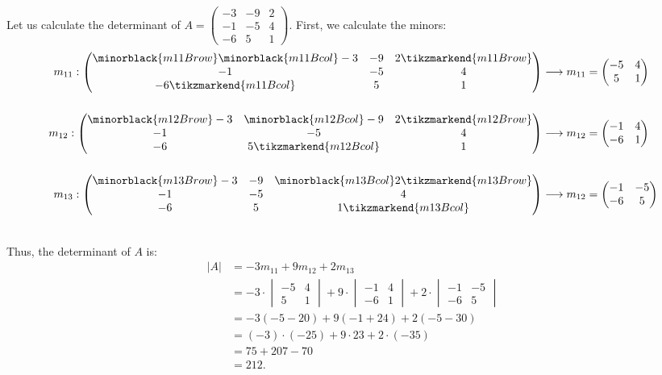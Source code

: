 \begin{example}
  Let us calculate the determinant of $A=\begin{pmatrix} -3 & -9 & 2 \\ -1 & -5 & 4 \\ -6 & 5 & 1 \end{pmatrix}$. First, we calculate the minors:
  \begin{align*}
	m_{11}: \begin{pmatrix} \minorblack{m11Brow}\minorblack{m11Bcol}-3 & -9 & 2\tikzmarkend{m11Brow} \\ -1 & -5 & 4 \\ -6\tikzmarkend{m11Bcol} & 5 & 1 \end{pmatrix} &\longrightarrow m_{11} = \begin{pmatrix} -5 & 4 \\ 5 & 1 \end{pmatrix}\\[5mm]
	m_{12}: \begin{pmatrix} \minorblack{m12Brow}-3 & \minorblack{m12Bcol}-9 & 2\tikzmarkend{m12Brow} \\ -1 & -5 & 4 \\ -6 & 5 \tikzmarkend{m12Bcol}& 1 \end{pmatrix} &\longrightarrow m_{12} = \begin{pmatrix} -1 & 4 \\ -6 & 1 \end{pmatrix}\\[5mm]
	m_{13}: \begin{pmatrix} \minorblack{m13Brow}-3 & -9 & \minorblack{m13Bcol}2\tikzmarkend{m13Brow} \\ -1 & -5 & 4 \\ -6 & 5 & 1\tikzmarkend{m13Bcol}\end{pmatrix} &\longrightarrow m_{12} = \begin{pmatrix} -1 & -5 \\ -6 & 5 \end{pmatrix}\\[5mm]
  \end{align*}

  Thus, the determinant of $A$ is:
  \begin{align*}
	|A| &= -3m_{11} + 9m_{12} + 2m_{13}\\[3mm]
	&= -3\cdot \begin{vmatrix} -5 & 4 \\ 5 & 1 \end{vmatrix} +9\cdot \begin{vmatrix}-1 & 4 \\ -6 & 1 \end{vmatrix} + 2\cdot \begin{vmatrix} -1 & -5 \\ -6 & 5 \end{vmatrix} \\
	&= -3\left( -5-20 \right) + 9\left(-1+24  \right) + 2\left( -5-30 \right)\\[3mm]
	&= (-3)\cdot(-25) + 9\cdot23 +2\cdot(-35)\\[3mm]
	&= 75 + 207 - 70\\[3mm]
	&= 212.
  \end{align*}
\end{example}


